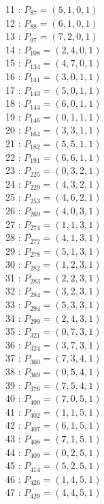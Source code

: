 \documentclass{article}
\begin{document}
{\begin{multicols}{3}
11 : $P_{87}=( 5, 1, 0, 1 )$\\
12 : $P_{88}=( 6, 1, 0, 1 )$\\
13 : $P_{97}=( 7, 2, 0, 1 )$\\
14 : $P_{108}=( 2, 4, 0, 1 )$\\
15 : $P_{134}=( 4, 7, 0, 1 )$\\
16 : $P_{141}=( 3, 0, 1, 1 )$\\
17 : $P_{143}=( 5, 0, 1, 1 )$\\
18 : $P_{144}=( 6, 0, 1, 1 )$\\
19 : $P_{146}=( 0, 1, 1, 1 )$\\
20 : $P_{164}=( 3, 3, 1, 1 )$\\
21 : $P_{182}=( 5, 5, 1, 1 )$\\
22 : $P_{191}=( 6, 6, 1, 1 )$\\
23 : $P_{225}=( 0, 3, 2, 1 )$\\
24 : $P_{229}=( 4, 3, 2, 1 )$\\
25 : $P_{253}=( 4, 6, 2, 1 )$\\
26 : $P_{269}=( 4, 0, 3, 1 )$\\
27 : $P_{274}=( 1, 1, 3, 1 )$\\
28 : $P_{277}=( 4, 1, 3, 1 )$\\
29 : $P_{278}=( 5, 1, 3, 1 )$\\
30 : $P_{282}=( 1, 2, 3, 1 )$\\
31 : $P_{283}=( 2, 2, 3, 1 )$\\
32 : $P_{284}=( 3, 2, 3, 1 )$\\
33 : $P_{294}=( 5, 3, 3, 1 )$\\
34 : $P_{299}=( 2, 4, 3, 1 )$\\
35 : $P_{321}=( 0, 7, 3, 1 )$\\
36 : $P_{324}=( 3, 7, 3, 1 )$\\
37 : $P_{360}=( 7, 3, 4, 1 )$\\
38 : $P_{369}=( 0, 5, 4, 1 )$\\
39 : $P_{376}=( 7, 5, 4, 1 )$\\
40 : $P_{400}=( 7, 0, 5, 1 )$\\
41 : $P_{402}=( 1, 1, 5, 1 )$\\
42 : $P_{407}=( 6, 1, 5, 1 )$\\
43 : $P_{408}=( 7, 1, 5, 1 )$\\
44 : $P_{409}=( 0, 2, 5, 1 )$\\
45 : $P_{414}=( 5, 2, 5, 1 )$\\
46 : $P_{426}=( 1, 4, 5, 1 )$\\
47 : $P_{429}=( 4, 4, 5, 1 )$\\

\end{multicols}}
\end{document}
